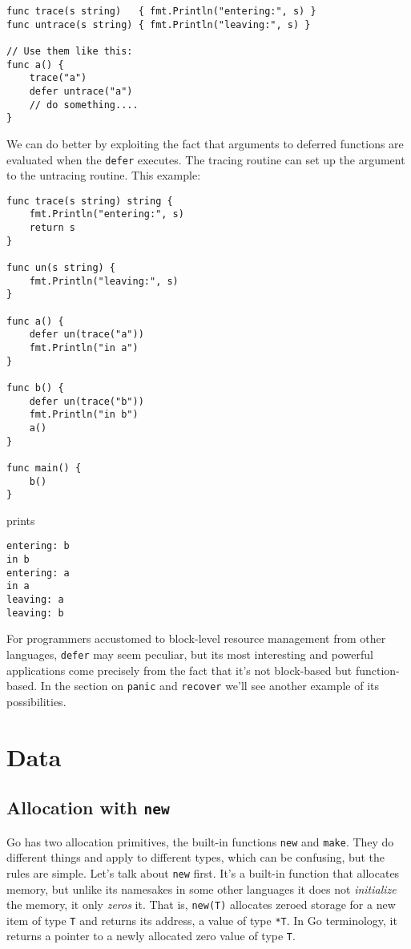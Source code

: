 \begin{Verbatim}[frame=single]
func trace(s string)   { fmt.Println("entering:", s) }
func untrace(s string) { fmt.Println("leaving:", s) }

// Use them like this:
func a() {
    trace("a")
    defer untrace("a")
    // do something....
}
\end{Verbatim}

We can do better by exploiting the fact that arguments to deferred
functions are evaluated when the \texttt{defer} executes. The tracing
routine can set up the argument to the untracing routine. This example:

\begin{Verbatim}[frame=single]
func trace(s string) string {
    fmt.Println("entering:", s)
    return s
}

func un(s string) {
    fmt.Println("leaving:", s)
}

func a() {
    defer un(trace("a"))
    fmt.Println("in a")
}

func b() {
    defer un(trace("b"))
    fmt.Println("in b")
    a()
}

func main() {
    b()
}
\end{Verbatim}

prints

\begin{Verbatim}[frame=single]
entering: b
in b
entering: a
in a
leaving: a
leaving: b
\end{Verbatim}

For programmers accustomed to block-level resource management from other
languages, \texttt{defer} may seem peculiar, but its most interesting
and powerful applications come precisely from the fact that it's not
block-based but function-based. In the section on \texttt{panic} and
\texttt{recover} we'll see another example of its possibilities.

\section*{Data}

\subsection*{Allocation with \texttt{new}}

Go has two allocation primitives, the built-in functions \texttt{new}
and \texttt{make}. They do different things and apply to different
types, which can be confusing, but the rules are simple. Let's talk
about \texttt{new} first. It's a built-in function that allocates
memory, but unlike its namesakes in some other languages it does not
\emph{initialize} the memory, it only \emph{zeros} it. That is,
\texttt{new(T)} allocates zeroed storage for a new item of type
\texttt{T} and returns its address, a value of type \texttt{*T}. In Go
terminology, it returns a pointer to a newly allocated zero value of
type \texttt{T}.

